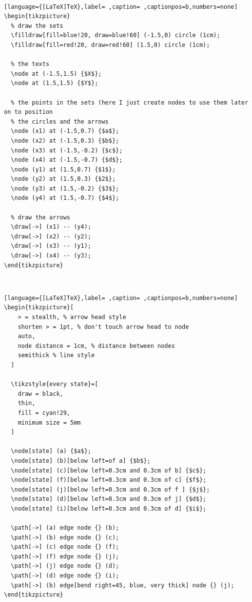 \documentclass[a4paper,12pt]{article}
\begin{document}
\\[0pt]

\begin{lstlisting}[language={[LaTeX]TeX},label= ,caption= ,captionpos=b,numbers=none]
\begin{tikzpicture}
  % draw the sets
  \filldraw[fill=blue!20, draw=blue!60] (-1.5,0) circle (1cm);
  \filldraw[fill=red!20, draw=red!60] (1.5,0) circle (1cm);

  % the texts
  \node at (-1.5,1.5) {$X$};
  \node at (1.5,1.5) {$Y$};

  % the points in the sets (here I just create nodes to use them later on to position
  % the circles and the arrows
  \node (x1) at (-1.5,0.7) {$a$};
  \node (x2) at (-1.5,0.3) {$b$};
  \node (x3) at (-1.5,-0.2) {$c$};
  \node (x4) at (-1.5,-0.7) {$d$};
  \node (y1) at (1.5,0.7) {$1$};
  \node (y2) at (1.5,0.3) {$2$};
  \node (y3) at (1.5,-0.2) {$3$};
  \node (y4) at (1.5,-0.7) {$4$};

  % draw the arrows
  \draw[->] (x1) -- (y4);
  \draw[->] (x2) -- (y2);
  \draw[->] (x3) -- (y1);
  \draw[->] (x4) -- (y3);
\end{tikzpicture}
\end{lstlisting}

\\[0pt]

\begin{lstlisting}[language={[LaTeX]TeX},label= ,caption= ,captionpos=b,numbers=none]
\begin{tikzpicture}[
    > = stealth, % arrow head style
    shorten > = 1pt, % don't touch arrow head to node
    auto,
    node distance = 1cm, % distance between nodes
    semithick % line style
  ]

  \tikzstyle{every state}=[
    draw = black,
    thin,
    fill = cyan!29,
    minimum size = 5mm
  ]

  \node[state] (a) {$a$};
  \node[state] (b)[below left=of a] {$b$};
  \node[state] (c)[below left=0.3cm and 0.3cm of b] {$c$};
  \node[state] (f)[below left=0.3cm and 0.3cm of c] {$f$};
  \node[state] (j)[below left=0.3cm and 0.3cm of f ] {$j$};
  \node[state] (d)[below left=0.3cm and 0.3cm of j] {$d$};
  \node[state] (i)[below left=0.3cm and 0.3cm of d] {$i$};

  \path[->] (a) edge node {} (b);
  \path[->] (b) edge node {} (c);
  \path[->] (c) edge node {} (f);
  \path[->] (f) edge node {} (j);
  \path[->] (j) edge node {} (d);
  \path[->] (d) edge node {} (i);
  \path[->] (b) edge[bend right=45, blue, very thick] node {} (j);
\end{tikzpicture}
\end{lstlisting}
\end{document}
